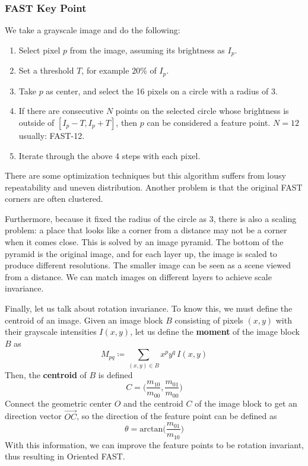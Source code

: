 \documentclass{article}
\newcounter{example}[section]
\newcounter{algo}[section]
\begin{document}
  \subsubsection{FAST Key Point}
  We take a grayscale image and do the following: 
  \begin{enumerate}
      \item Select pixel $p$ from the image, assuming its brightness as $I_p$. 
      \item Set a threshold $T$, for example $20\%$ of $I_p$. 
      \item Take $p$ as center, and select the 16 pixels on a circle with a radius of $3$. 
      \item If there are consecutive $N$ points on the selected circle whose brightness is outside of $[I_p - T, I_p + T]$, then $p$ can be considered a feature point. $N = 12$ usually: FAST-12. 
      \item Iterate through the above 4 steps with each pixel. 
  \end{enumerate}
  There are some optimization techniques but this algorithm suffers from lousy repeatability and uneven distribution. Another problem is that the original FAST corners are often clustered. 

  Furthermore, because it fixed the radius of the circle as $3$, there is also a scaling problem: a place that looks like a corner from a distance may not be a corner when it comes close. This is solved by an image pyramid. The bottom of the pyramid is the original image, and for each layer up, the image is scaled to produce different resolutions. The smaller image can be seen as a scene viewed from a distance. We can match images on different layers to achieve scale invariance. 

  Finally, let us talk about rotation invariance. To know this, we must define the centroid of an image. Given an image block $B$ consisting of pixels $(x, y)$ with their grayscale intensities $I(x, y)$, let us define the \textbf{moment} of the image block $B$ as 
  \begin{equation}
    M_{p q} \coloneqq \sum_{(x, y) \in B} x^p y^q \, I(x, y)
  \end{equation}
  Then, the \textbf{centroid} of $B$ is defined 
  \begin{equation}
    C = \bigg(\frac{m_{10}}{m_{00}} , \frac{m_{01}}{m_{00}} \bigg)
  \end{equation}
  Connect the geometric center $O$ and the centroid $C$ of the image block to get an direction vector $\overrightarrow{OC}$, so the direction of the feature point can be defined as 
  \begin{equation}
    \theta = \mathrm{arctan}\Big( \frac{m_{01}}{m_{10}} \Big)
  \end{equation}
  With this information, we can improve the feature points to be rotation invariant, thus resulting in Oriented FAST. 
\end{document}
